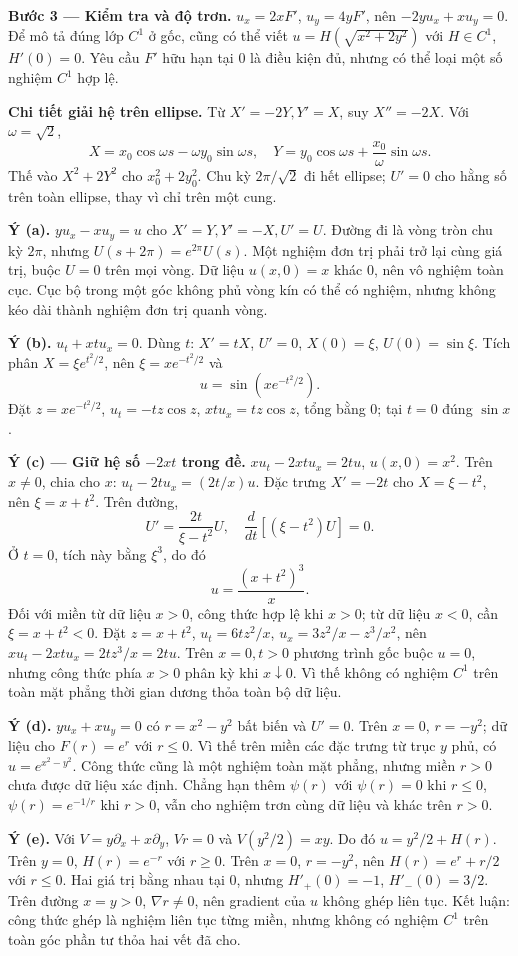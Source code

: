 \textbf{Bước 3 — Kiểm tra và độ trơn.} $u_x=2xF'$, $u_y=4yF'$, nên $-2yu_x+xu_y=0$. Để mô tả đúng lớp $C^1$ ở gốc, cũng có thể viết $u=H(\sqrt{x^2+2y^2})$ với $H\in C^1$, $H'(0)=0$. Yêu cầu $F'$ hữu hạn tại 0 là điều kiện đủ, nhưng có thể loại một số nghiệm $C^1$ hợp lệ.

\textbf{Chi tiết giải hệ trên ellipse.} Từ $X'=-2Y,Y'=X$, suy $X''=-2X$. Với $\omega=\sqrt2$,
\[X=x_0\cos\omega s-\omega y_0\sin\omega s,\quad
Y=y_0\cos\omega s+\frac{x_0}{\omega}\sin\omega s.\]
Thế vào $X^2+2Y^2$ cho $x_0^2+2y_0^2$. Chu kỳ $2\pi/\sqrt2$ đi hết ellipse; $U'=0$ cho hằng số trên toàn ellipse, thay vì chỉ trên một cung.

\textbf{Ý (a).} $yu_x-xu_y=u$ cho $X'=Y,Y'=-X,U'=U$. Đường đi là vòng tròn chu kỳ $2\pi$, nhưng $U(s+2\pi)=e^{2\pi}U(s)$. Một nghiệm đơn trị phải trở lại cùng giá trị, buộc $U=0$ trên mọi vòng. Dữ liệu $u(x,0)=x$ khác 0, nên vô nghiệm toàn cục. Cục bộ trong một góc không phủ vòng kín có thể có nghiệm, nhưng không kéo dài thành nghiệm đơn trị quanh vòng.

\textbf{Ý (b).} $u_t+xtu_x=0$. Dùng $t$: $X'=tX$, $U'=0$, $X(0)=\xi$, $U(0)=\sin\xi$. Tích phân $X=\xi e^{t^2/2}$, nên $\xi=xe^{-t^2/2}$ và
\[u=\sin(xe^{-t^2/2}).\]
Đặt $z=xe^{-t^2/2}$, $u_t=-tz\cos z$, $xtu_x=tz\cos z$, tổng bằng 0; tại $t=0$ đúng $\sin x$.

\textbf{Ý (c) — Giữ hệ số $-2xt$ trong đề.} $xu_t-2xtu_x=2tu$, $u(x,0)=x^2$. Trên $x\ne0$, chia cho $x$: $u_t-2tu_x=(2t/x)u$. Đặc trưng $X'= -2t$ cho $X=\xi-t^2$, nên $\xi=x+t^2$. Trên đường,
\[U'=\frac{2t}{\xi-t^2}U,\quad \frac{d}{dt}[(\xi-t^2)U]=0.\]
Ở $t=0$, tích này bằng $\xi^3$, do đó
\[u=\frac{(x+t^2)^3}{x}.\]
Đối với miền từ dữ liệu $x>0$, công thức hợp lệ khi $x>0$; từ dữ liệu $x<0$, cần $\xi=x+t^2<0$. Đặt $z=x+t^2$, $u_t=6tz^2/x$, $u_x=3z^2/x-z^3/x^2$, nên $xu_t-2xtu_x=2tz^3/x=2tu$. Trên $x=0,t>0$ phương trình gốc buộc $u=0$, nhưng công thức phía $x>0$ phân kỳ khi $x\downarrow0$. Vì thế không có nghiệm $C^1$ trên toàn mặt phẳng thời gian dương thỏa toàn bộ dữ liệu.

\textbf{Ý (d).} $yu_x+xu_y=0$ có $r=x^2-y^2$ bất biến và $U'=0$. Trên $x=0$, $r=-y^2$; dữ liệu cho $F(r)=e^r$ với $r\le0$. Vì thế trên miền các đặc trưng từ trục $y$ phủ, có $u=e^{x^2-y^2}$. Công thức cũng là một nghiệm toàn mặt phẳng, nhưng miền $r>0$ chưa được dữ liệu xác định. Chẳng hạn thêm $\psi(r)$ với $\psi(r)=0$ khi $r\le0$, $\psi(r)=e^{-1/r}$ khi $r>0$, vẫn cho nghiệm trơn cùng dữ liệu và khác trên $r>0$.

\textbf{Ý (e).} Với $V=y\partial_x+x\partial_y$, $Vr=0$ và $V(y^2/2)=xy$. Do đó $u=y^2/2+H(r)$. Trên $y=0$, $H(r)=e^{-r}$ với $r\ge0$. Trên $x=0$, $r=-y^2$, nên $H(r)=e^r+r/2$ với $r\le0$. Hai giá trị bằng nhau tại 0, nhưng $H'_+(0)=-1$, $H'_-(0)=3/2$. Trên đường $x=y>0$, $\nabla r\ne0$, nên gradient của $u$ không ghép liên tục. Kết luận: công thức ghép là nghiệm liên tục từng miền, nhưng không có nghiệm $C^1$ trên toàn góc phần tư thỏa hai vết đã cho.

